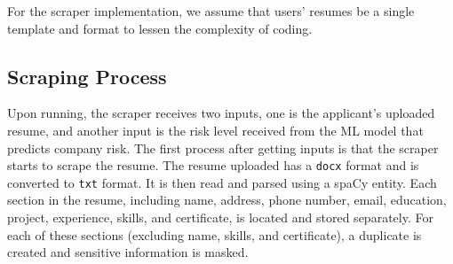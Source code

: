 \documentclass{article}
\begin{document}
For the scraper implementation, we assume that users' resumes be a single template and format to lessen the complexity of coding. 


\begin{center}
\end{center}




\subsection{Scraping Process}
Upon running, the scraper receives two inputs, one is the applicant's uploaded resume, and another input is the risk level received from the ML model that predicts company risk. 
The first process after getting inputs is that the scraper starts to scrape the resume. The resume uploaded has a \texttt{docx} format and is converted to \texttt{txt} format. It is then read and parsed using a spaCy entity. Each section in the resume, including name, address, phone number, email, education, project, experience, skills, and certificate, is located and stored separately. For each of these sections (excluding name, skills, and certificate), a duplicate is created and sensitive information is masked.
\end{document}

